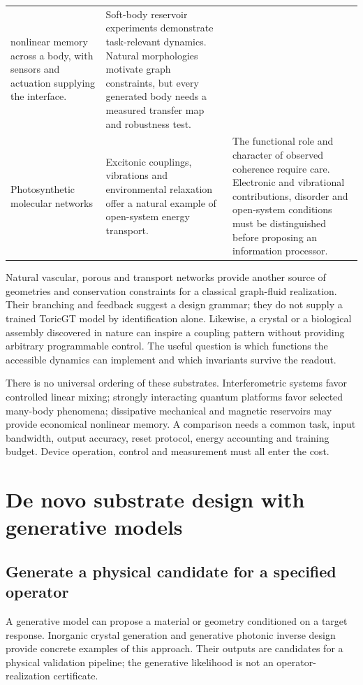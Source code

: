 \begin{longtable}{p{}p{}p{}}
nonlinear memory across a body, with sensors and actuation supplying
the interface. &
Soft-body reservoir experiments demonstrate task-relevant dynamics.
Natural morphologies motivate graph constraints, but every generated
body needs a measured transfer map and robustness test.
\cite{qtsNakajima2015}\\[6pt]
Photosynthetic molecular networks &
Excitonic couplings, vibrations and environmental relaxation offer a
natural example of open-system energy transport. &
The functional role and character of observed coherence require care.
Electronic and vibrational contributions, disorder and open-system
conditions must be distinguished before proposing an information
processor.\cite{qtsDuan2017,qtsHarushDubi2021}\\\bottomrule
\end{longtable}

Natural vascular, porous and transport networks provide another source of
geometries and conservation constraints for a classical graph-fluid
realization. Their branching and feedback suggest a design grammar;
they do not supply a trained ToricGT model by identification alone.
Likewise, a crystal or a biological assembly discovered in nature can
inspire a coupling pattern without providing arbitrary programmable
control. The useful question is which functions the accessible dynamics
can implement and which invariants survive the readout.

There is no universal ordering of these substrates. Interferometric
systems favor controlled linear mixing; strongly interacting quantum
platforms favor selected many-body phenomena; dissipative mechanical and
magnetic reservoirs may provide economical nonlinear memory. A comparison
needs a common task, input bandwidth, output accuracy, reset protocol,
energy accounting and training budget. Device operation, control and
measurement must all enter the cost.

\section{De novo substrate design with generative models}

\subsection{Generate a physical candidate for a specified operator}

A generative model can propose a material or geometry conditioned on a
target response. Inorganic crystal generation and generative photonic
inverse design provide concrete examples of this approach. Their outputs
are candidates for a physical validation pipeline; the generative likelihood
is not an operator-realization certificate.\cite{qtsZeni2025,qtsJiangFan2019}


